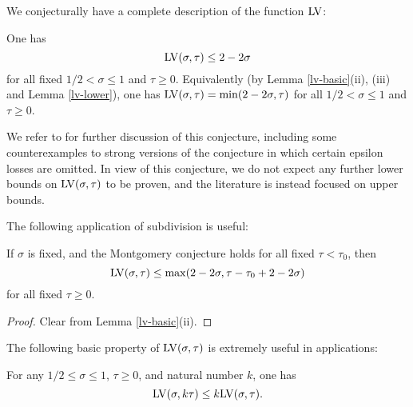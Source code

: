 We conjecturally have a complete description of the function $\mathrm{LV}$:

\begin{conjecture}\label{montgomery-conj}  One has
    \begin{equation}\label{mont-conj}
        \mathrm{LV}(\sigma, \tau) \leq 2 - 2 \sigma
    \end{equation}
     for all fixed $1/2 < \sigma \leq 1$ and $\tau \geq 0$. Equivalently (by Lemma \ref{lv-basic}(ii), (iii) and Lemma \ref{lv-lower}), one has $\mathrm{LV}(\sigma, \tau) = \min(2 - 2 \sigma,\tau)$ for all $1/2 < \sigma \leq 1$ and $\tau \geq 0$.
\end{conjecture}


We refer to \cite{bourgain_montgomery_1991} for further discussion of this conjecture, including some counterexamples to strong versions of the conjecture in which certain epsilon losses are omitted.  In view of this conjecture, we do not expect any further lower bounds on $\mathrm{LV}(\sigma,\tau)$ to be proven, and the literature is instead focused on upper bounds.

The following application of subdivision is useful:

\begin{lemma}\label{montgomery-subdivide}  If $\sigma$ is fixed, and the Montgomery conjecture holds for all fixed $\tau < \tau_0$, then
\begin{equation}\label{lvt-opt}
    \mathrm{LV}(\sigma, \tau) \leq \max( 2 - 2 \sigma, \tau - \tau_0 + 2 - 2\sigma)
\end{equation}
for all fixed $\tau \geq 0$.
\end{lemma}

\begin{proof}
Clear from Lemma \ref{lv-basic}(ii).
\end{proof}


The following basic property of $\mathrm{LV}(\sigma,\tau)$ is extremely useful in applications:

\begin{lemma}\label{power-lemma}  For any $1/2 \leq \sigma \leq 1$, $\tau \geq 0$, and natural number $k$, one has
    $$ \mathrm{LV}(\sigma, k\tau) \leq k \mathrm{LV}(\sigma, \tau).$$
\end{lemma}


